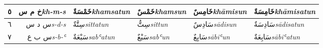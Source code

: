 \documentclass[11pt, a4paper]{article}
\begin{document}
\begin{center}
\begin{threeparttable}
\begin{tabular}{ C R A A A A }
			{\Large\textarabic{٥}}                        &
			{\Large\textarabic{خ م س}}\newline \textit{\small kh-m-s}                &
			{\Large\textarabic{خَمْسَةٌ}}\newline \textit{\small khamsatun}              &
			{\Large\textarabic{خَمْسٌ}}\newline \textit{\small khamsun}                 &
			{\Large\textarabic{خَامِسٌ}}\newline \textit{\small khāmisun}               &
			{\Large\textarabic{خَامِسَةٌ}}\newline \textit{\small khāmisatun}                                                                                                                                 \\
			\midrule

			{\Large\textarabic{٦}}                        &
			{\Large\textarabic{س د س}}\newline \textit{\small s-d-s}      &
			{\Large\textarabic{سِتَّةٌ}}\newline \textit{\small sittatun}                &
			{\Large\textarabic{سِتٌّ}}\newline \textit{\small sittun}                   &
			{\Large\textarabic{سَادِسٌ}}\newline \textit{\small sādisun}                &
			{\Large\textarabic{سَادِسَةٌ}}\newline \textit{\small sādisatun}                                                                                                                                  \\
			\midrule

			{\Large\textarabic{٧}}                        &
			{\Large\textarabic{س ب ع}}\newline \textit{\small s-b-ʿ}                 &
			{\Large\textarabic{سَبْعَةٌ}}\newline \textit{\small sabʿatun}               &
			{\Large\textarabic{سَبْعٌ}}\newline \textit{\small sabʿun}                  &
			{\Large\textarabic{سَابِعٌ}}\newline \textit{\small sābiʿun}                &
			{\Large\textarabic{سَابِعَةٌ}}\newline \textit{\small sābiʿatun}                                                                                                                                  \\
			\midrule


\end{tabular}
\end{threeparttable}
\end{center}
\end{document}

